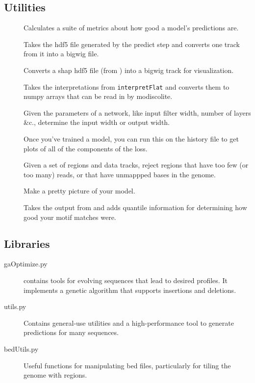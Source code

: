 \documentclass{article}
\begin{document}
\subsection{Utilities}

\begin{description}
    \item [] Calculates a suite of metrics about how good a model's predictions are.
    \item [] Takes the hdf5 file generated by the predict step and converts one
        track from it into a bigwig file.
    \item [] Converts a shap hdf5 file (from ) into a
        bigwig track for visualization.
    \item [] Takes the interpretations from \texttt{interpretFlat} and converts
        them to numpy arrays that can be read in by modiscolite.
    \item [] Given the parameters of a network, like input filter width, number of
        layers \&c., determine the input width or output width.
    \item [] Once you've trained a model, you can run this on the history file
        to get plots of all of the components of the loss.
    \item [] Given a set of regions and data tracks, reject regions that have too
        few (or too many) reads, or that have unmappped bases in the genome.
    \item [] Make a pretty picture of your model.
    \item [] Takes the output from  and adds quantile
        information for determining how good your motif matches were.
\end{description}

\subsection{Libraries}

\begin{description}
    \item [gaOptimize.py] contains tools for evolving sequences that lead to desired profiles.
        It implements a genetic algorithm that supports insertions and deletions.
    \item [utils.py] Contains general-use utilities and a high-performance tool to generate
        predictions for many sequences.
    \item [bedUtils.py] Useful functions for manipulating bed files, particularly for tiling
        the genome with regions.
\end{description}
\end{document}

